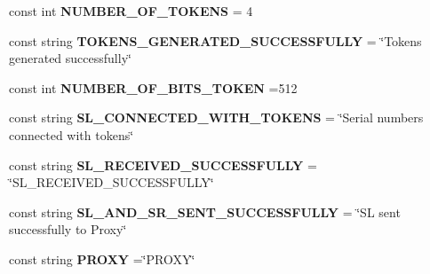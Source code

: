 \begin{DoxyCompactItemize}
\item 
\hypertarget{class_election_authority_1_1_constants_a46feadcc571278025f21b29ed0f9c89c}{}const int {\bfseries N\+U\+M\+B\+E\+R\+\_\+\+O\+F\+\_\+\+T\+O\+K\+E\+N\+S} = 4\label{class_election_authority_1_1_constants_a46feadcc571278025f21b29ed0f9c89c}

\item 
\hypertarget{class_election_authority_1_1_constants_a2f27187ba8d2e211dcc1e71bafb1f153}{}const string {\bfseries T\+O\+K\+E\+N\+S\+\_\+\+G\+E\+N\+E\+R\+A\+T\+E\+D\+\_\+\+S\+U\+C\+C\+E\+S\+S\+F\+U\+L\+L\+Y} = \char`\"{}Tokens generated successfully\char`\"{}\label{class_election_authority_1_1_constants_a2f27187ba8d2e211dcc1e71bafb1f153}

\item 
\hypertarget{class_election_authority_1_1_constants_a42bb446aa5d8917b47a2c98893ed2ae1}{}const int {\bfseries N\+U\+M\+B\+E\+R\+\_\+\+O\+F\+\_\+\+B\+I\+T\+S\+\_\+\+T\+O\+K\+E\+N} =512\label{class_election_authority_1_1_constants_a42bb446aa5d8917b47a2c98893ed2ae1}

\item 
\hypertarget{class_election_authority_1_1_constants_af30758e38d2e4ff6d10f071b039d92a6}{}const string {\bfseries S\+L\+\_\+\+C\+O\+N\+N\+E\+C\+T\+E\+D\+\_\+\+W\+I\+T\+H\+\_\+\+T\+O\+K\+E\+N\+S} = \char`\"{}Serial numbers connected with tokens\char`\"{}\label{class_election_authority_1_1_constants_af30758e38d2e4ff6d10f071b039d92a6}

\item 
\hypertarget{class_election_authority_1_1_constants_adb879bc3dce48c69eec79ce0a6f499e5}{}const string {\bfseries S\+L\+\_\+\+R\+E\+C\+E\+I\+V\+E\+D\+\_\+\+S\+U\+C\+C\+E\+S\+S\+F\+U\+L\+L\+Y} = \char`\"{}S\+L\+\_\+\+R\+E\+C\+E\+I\+V\+E\+D\+\_\+\+S\+U\+C\+C\+E\+S\+S\+F\+U\+L\+L\+Y\char`\"{}\label{class_election_authority_1_1_constants_adb879bc3dce48c69eec79ce0a6f499e5}

\item 
\hypertarget{class_election_authority_1_1_constants_a2fd1053467beee8dae6266ed5c386533}{}const string {\bfseries S\+L\+\_\+\+A\+N\+D\+\_\+\+S\+R\+\_\+\+S\+E\+N\+T\+\_\+\+S\+U\+C\+C\+E\+S\+S\+F\+U\+L\+L\+Y} = \char`\"{}S\+L sent successfully to Proxy\char`\"{}\label{class_election_authority_1_1_constants_a2fd1053467beee8dae6266ed5c386533}

\item 
\hypertarget{class_election_authority_1_1_constants_a8dcfc266f9563c6f57b1c7869c4fa552}{}const string {\bfseries P\+R\+O\+X\+Y} =\char`\"{}P\+R\+O\+X\+Y\char`\"{}\label{class_election_authority_1_1_constants_a8dcfc266f9563c6f57b1c7869c4fa552}


\end{DoxyCompactItemize}
